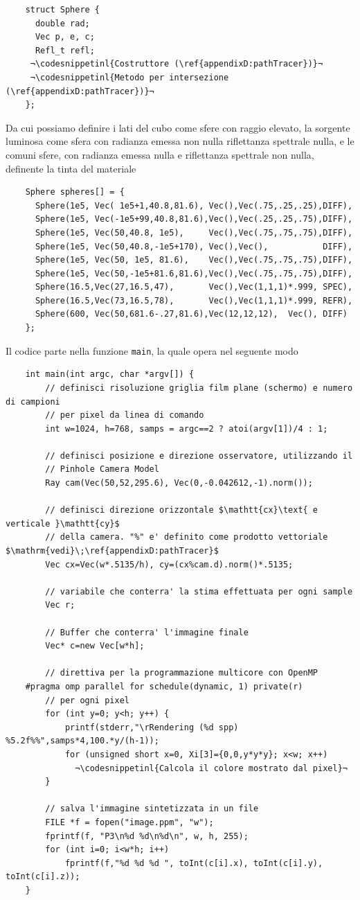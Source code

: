 \begin{verbatim}
	struct Sphere { 
	  double rad;
	  Vec p, e, c;
	  Refl_t refl;      
	 ¬\codesnippetinl{Costruttore (\ref{appendixD:pathTracer})}¬
	 ¬\codesnippetinl{Metodo per intersezione (\ref{appendixD:pathTracer})}¬
	}; 
\end{verbatim}
Da cui possiamo definire i lati del cubo come sfere con raggio elevato, la sorgente luminosa come sfera con radianza emessa non nulla riflettanza 
spettrale nulla, e le comuni sfere, con radianza emessa nulla e riflettanza spettrale non nulla, definente la tinta del materiale
\begin{verbatim}
	Sphere spheres[] = {
	  Sphere(1e5, Vec( 1e5+1,40.8,81.6), Vec(),Vec(.75,.25,.25),DIFF),
	  Sphere(1e5, Vec(-1e5+99,40.8,81.6),Vec(),Vec(.25,.25,.75),DIFF),
	  Sphere(1e5, Vec(50,40.8, 1e5),     Vec(),Vec(.75,.75,.75),DIFF),
	  Sphere(1e5, Vec(50,40.8,-1e5+170), Vec(),Vec(),           DIFF),
	  Sphere(1e5, Vec(50, 1e5, 81.6),    Vec(),Vec(.75,.75,.75),DIFF),
	  Sphere(1e5, Vec(50,-1e5+81.6,81.6),Vec(),Vec(.75,.75,.75),DIFF),
	  Sphere(16.5,Vec(27,16.5,47),       Vec(),Vec(1,1,1)*.999, SPEC),
	  Sphere(16.5,Vec(73,16.5,78),       Vec(),Vec(1,1,1)*.999, REFR),
	  Sphere(600, Vec(50,681.6-.27,81.6),Vec(12,12,12),  Vec(), DIFF) 
	}; 
\end{verbatim}
Il codice parte nella funzione \texttt{main}, la quale opera nel seguente modo
\begin{verbatim}
	int main(int argc, char *argv[]) {
		// definisci risoluzione griglia film plane (schermo) e numero di campioni
		// per pixel da linea di comando
		int w=1024, h=768, samps = argc==2 ? atoi(argv[1])/4 : 1;

		// definisci posizione e direzione osservatore, utilizzando il
		// Pinhole Camera Model
		Ray cam(Vec(50,52,295.6), Vec(0,-0.042612,-1).norm());

		// definisci direzione orizzontale $\mathtt{cx}\text{ e verticale }\mathtt{cy}$
		// della camera. "%" e' definito come prodotto vettoriale $\mathrm{vedi}\;\ref{appendixD:pathTracer}$
		Vec cx=Vec(w*.5135/h), cy=(cx%cam.d).norm()*.5135;

		// variabile che conterra' la stima effettuata per ogni sample
		Vec r;

		// Buffer che conterra' l'immagine finale
		Vec* c=new Vec[w*h];

		// direttiva per la programmazione multicore con OpenMP
	#pragma omp parallel for schedule(dynamic, 1) private(r)
		// per ogni pixel
		for (int y=0; y<h; y++) {
			printf(stderr,"\rRendering (%d spp) %5.2f%%",samps*4,100.*y/(h-1));
			for (unsigned short x=0, Xi[3]={0,0,y*y*y}; x<w; x++)
			  ¬\codesnippetinl{Calcola il colore mostrato dal pixel}¬
		} 

		// salva l'immagine sintetizzata in un file
		FILE *f = fopen("image.ppm", "w");
		fprintf(f, "P3\n%d %d\n%d\n", w, h, 255);
		for (int i=0; i<w*h; i++)
			fprintf(f,"%d %d %d ", toInt(c[i].x), toInt(c[i].y), toInt(c[i].z));
	} 
\end{verbatim}
